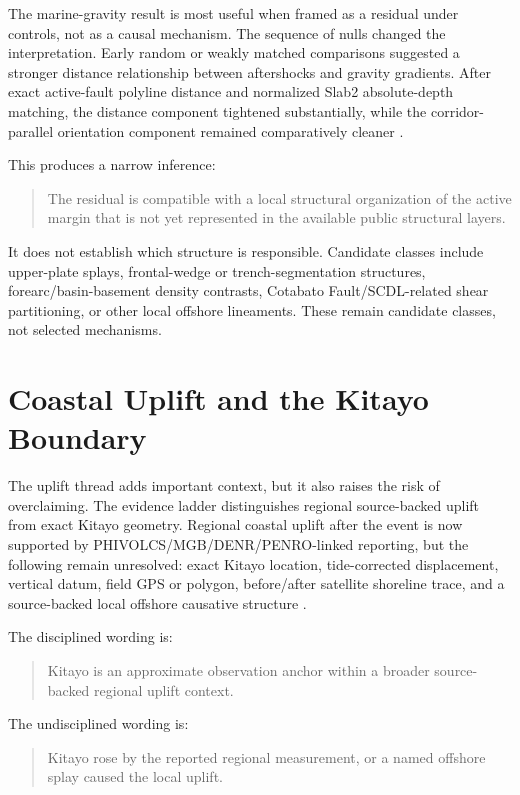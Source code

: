\documentclass[11pt]{article}
\begin{document}
The marine-gravity result is most useful when framed as a residual under controls, not as a causal mechanism. The sequence of nulls changed the interpretation. Early random or weakly matched comparisons suggested a stronger distance relationship between aftershocks and gravity gradients. After exact active-fault polyline distance and normalized Slab2 absolute-depth matching, the distance component tightened substantially, while the corridor-parallel orientation component remained comparatively cleaner \cite{tmch-v05}.

This produces a narrow inference:
\begin{quote}
The residual is compatible with a local structural organization of the active margin that is not yet represented in the available public structural layers.
\end{quote}

It does not establish which structure is responsible. Candidate classes include upper-plate splays, frontal-wedge or trench-segmentation structures, forearc/basin-basement density contrasts, Cotabato Fault/SCDL-related shear partitioning, or other local offshore lineaments. These remain candidate classes, not selected mechanisms.

\section{Coastal Uplift and the Kitayo Boundary}

The uplift thread adds important context, but it also raises the risk of overclaiming. The evidence ladder distinguishes regional source-backed uplift from exact Kitayo geometry. Regional coastal uplift after the event is now supported by PHIVOLCS/MGB/DENR/PENRO-linked reporting, but the following remain unresolved: exact Kitayo location, tide-corrected displacement, vertical datum, field GPS or polygon, before/after satellite shoreline trace, and a source-backed local offshore causative structure \cite{kitayo-ladder}.

The disciplined wording is:
\begin{quote}
Kitayo is an approximate observation anchor within a broader source-backed regional uplift context.
\end{quote}

The undisciplined wording is:
\begin{quote}
Kitayo rose by the reported regional measurement, or a named offshore splay caused the local uplift.
\end{quote}
\end{document}
